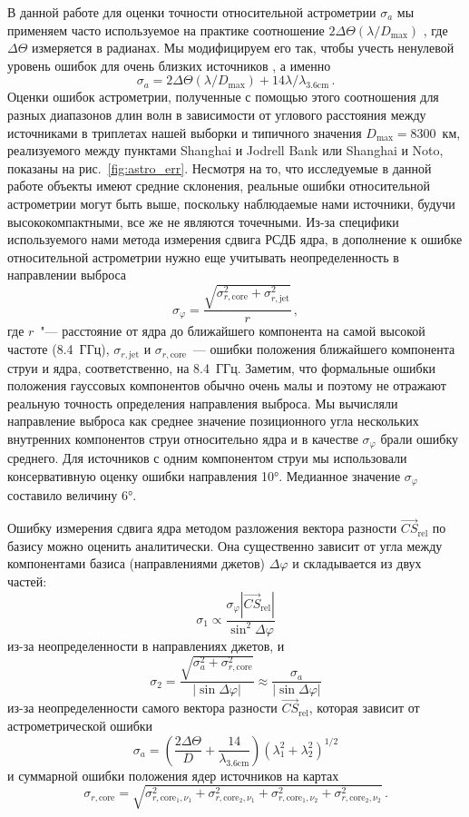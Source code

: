 В данной работе для оценки точности относительной астрометрии $\sigma_a$ мы применяем часто
используемое на практике соотношение $2\Delta\Theta(\lambda/D_\text{max})$ \cite{Reid14}, где
$\Delta\Theta$ измеряется в радианах. Мы модифицируем его так, чтобы учесть ненулевой уровень ошибок
для очень близких источников \cite{Pradel06}, а именно
\[
\sigma_a = 2\Delta\Theta(\lambda/D_\text{max}) + 14 \lambda/\lambda_{\text{3.6cm}}\,.
\]
\noindent
Оценки ошибок астрометрии, полученные с помощью этого соотношения для разных
диапазонов длин волн в зависимости от углового расстояния между источниками
в триплетах нашей выборки и типичного значения $D_\textrm{max}=8300$~км,
реализуемого между пунктами Shanghai и Jodrell Bank или Shanghai и Noto, показаны
на рис.~\ref{fig:astro_err}. Несмотря на то, что исследуемые в данной работе
объекты имеют средние склонения, реальные ошибки относительной астрометрии
могут быть выше, поскольку наблюдаемые нами источники, будучи высококомпактными,
все же не являются точечными. Из-за специфики используемого нами метода
измерения сдвига РСДБ ядра, в дополнение к ошибке относительной астрометрии нужно еще учитывать
неопределенность в направлении выброса
\[
\sigma_\varphi = \frac{\sqrt{\sigma_{r,\text{core}}^2 + \sigma_{r,\text{jet}}^2}}{r}\,,
\]
\noindent
где $r$~"--- расстояние от ядра до ближайшего компонента на самой высокой частоте (8.4~ГГц),
$\sigma_{r,\text{jet}}$ и $\sigma_{r,\text{core}}$~--- ошибки положения ближайшего компонента
струи и ядра, соответственно, на 8.4~ГГц. Заметим, что формальные ошибки положения гауссовых
компонентов обычно очень малы и поэтому не отражают реальную точность определения
направления выброса. Мы вычисляли направление выброса как среднее значение позиционного угла
нескольких внутренних компонентов струи относительно ядра и в качестве $\sigma_\varphi$ брали ошибку
среднего. Для источников с одним компонентом струи мы использовали консервативную оценку ошибки
направления \ang{10}. Медианное значение $\sigma_\varphi$ составило величину \ang{6}.

Ошибку измерения сдвига ядра методом разложения вектора разности $\vec{CS}_{\text{rel}}$
по базису можно оценить аналитически. Она существенно зависит от угла между компонентами
базиса (направлениями джетов) $\Delta \varphi$ и складывается из двух частей:
\[
\sigma_1 \propto \frac{\sigma_\varphi|\vec{CS}_{\text{rel}}|}{\sin^2 \Delta \varphi}
\]
из-за неопределенности в направлениях джетов, и
\[
\sigma_2 = \frac{\sqrt{\sigma_a^2+\sigma_{r,\text{core}}^2}}{|\sin\Delta \varphi|} \approx
\frac{\sigma_a}{|\sin \Delta \varphi|}
\]
из-за неопределенности самого вектора разности $\vec{CS}_{\text{rel}}$, которая зависит от
астрометрической ошибки
\[
\sigma_a= \left(\frac{2\Delta\Theta}{D} + \frac{14}{\lambda_{\text{3.6cm}}}\right)
\left(\lambda_1^2 + \lambda_2^2\right)^{1/2}
\]
и суммарной ошибки положения ядер источников на картах
\[
\sigma_{r,\text{core}} = \sqrt{\sigma_{r,\text{core}_1,\nu_1}^2 +
\sigma_{r,\text{core}_2,\nu_1}^2 + \sigma_{r,\text{core}_1,\nu_2}^2 +
\sigma_{r,\text{core}_2,\nu_2}^2} \,.
\]

